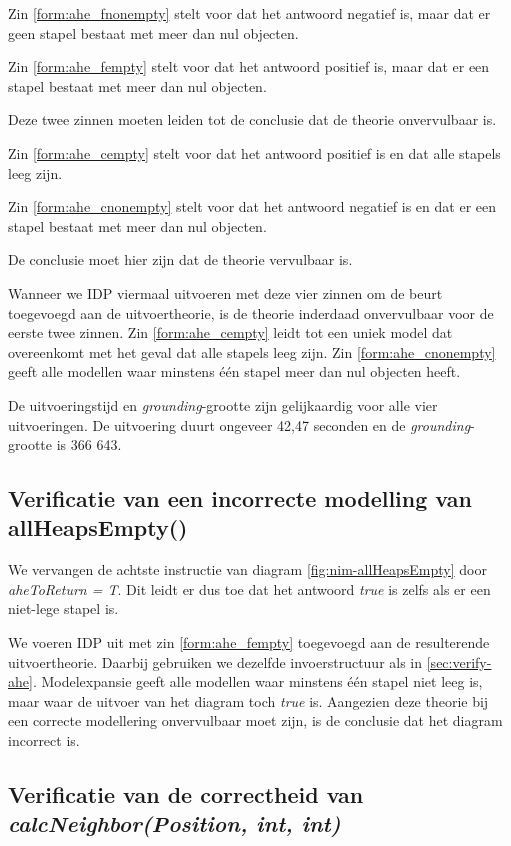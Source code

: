 Zin \ref{form:ahe_fnonempty} stelt voor dat het antwoord negatief is, maar dat er geen stapel bestaat met meer dan nul objecten.

Zin \ref{form:ahe_fempty} stelt voor dat het antwoord positief is, maar dat er een stapel bestaat met meer dan nul objecten.

Deze twee zinnen moeten leiden tot de conclusie dat de theorie onvervulbaar is.

Zin \ref{form:ahe_cempty} stelt voor dat het antwoord positief is en dat alle stapels leeg zijn.

Zin \ref{form:ahe_cnonempty} stelt voor dat het antwoord negatief is en dat er een stapel bestaat met meer dan nul objecten.

De conclusie moet hier zijn dat de theorie vervulbaar is.

Wanneer we IDP viermaal uitvoeren met deze vier zinnen om de beurt toegevoegd aan de uitvoertheorie, is de theorie inderdaad onvervulbaar voor de eerste twee zinnen. Zin \ref{form:ahe_cempty} leidt tot een uniek model dat overeenkomt met het geval dat alle stapels leeg zijn. Zin \ref{form:ahe_cnonempty} geeft alle modellen waar minstens \'e\'en stapel meer dan nul objecten heeft.

De uitvoeringstijd en \textit{grounding}-grootte zijn gelijkaardig voor alle vier uitvoeringen. De uitvoering duurt ongeveer 42,47 seconden en de \textit{grounding}-grootte is 366 643.

\subsection{Verificatie van een incorrecte modelling van allHeapsEmpty()}

We vervangen de achtste instructie van diagram \ref{fig:nim-allHeapsEmpty} door \textit{aheToReturn = T}. Dit leidt er dus toe dat het antwoord \textit{true} is zelfs als er een niet-lege stapel is.

We voeren IDP uit met zin \ref{form:ahe_fempty} toegevoegd aan de resulterende uitvoertheorie. Daarbij gebruiken we dezelfde invoerstructuur als in \ref{sec:verify-ahe}. Modelexpansie geeft alle modellen waar minstens \'e\'en stapel niet leeg is, maar waar de uitvoer van het diagram toch \textit{true} is. Aangezien deze theorie bij een correcte modellering onvervulbaar moet zijn, is de conclusie dat het diagram incorrect is.

\subsection{Verificatie van de correctheid van \textit{calcNeighbor(Position, int, int)}}\label{sec:verify-neighbor}

